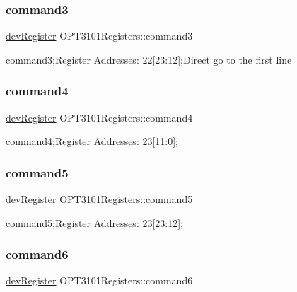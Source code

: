 \subsubsection{\texorpdfstring{command3}{command3}}
{\footnotesize\ttfamily \mbox{\hyperlink{classdev_register}{dev\+Register}} O\+P\+T3101\+Registers\+::command3}



command3;Register Addresses\+: 22\mbox{[}23\+:12\mbox{]};Direct go to the first line 

\mbox{\label{class_o_p_t3101_registers_aa4043e52e1a051353cdf8550a85853e0}} 
\subsubsection{\texorpdfstring{command4}{command4}}
{\footnotesize\ttfamily \mbox{\hyperlink{classdev_register}{dev\+Register}} O\+P\+T3101\+Registers\+::command4}



command4;Register Addresses\+: 23\mbox{[}11\+:0\mbox{]}; 

\mbox{\label{class_o_p_t3101_registers_a762c792d69a50391048fea3e6050d5cd}} 
\subsubsection{\texorpdfstring{command5}{command5}}
{\footnotesize\ttfamily \mbox{\hyperlink{classdev_register}{dev\+Register}} O\+P\+T3101\+Registers\+::command5}



command5;Register Addresses\+: 23\mbox{[}23\+:12\mbox{]}; 

\mbox{\label{class_o_p_t3101_registers_aabe00c6eb9a94d907bab6a1f067d2ea7}} 
\subsubsection{\texorpdfstring{command6}{command6}}
{\footnotesize\ttfamily \mbox{\hyperlink{classdev_register}{dev\+Register}} O\+P\+T3101\+Registers\+::command6}



